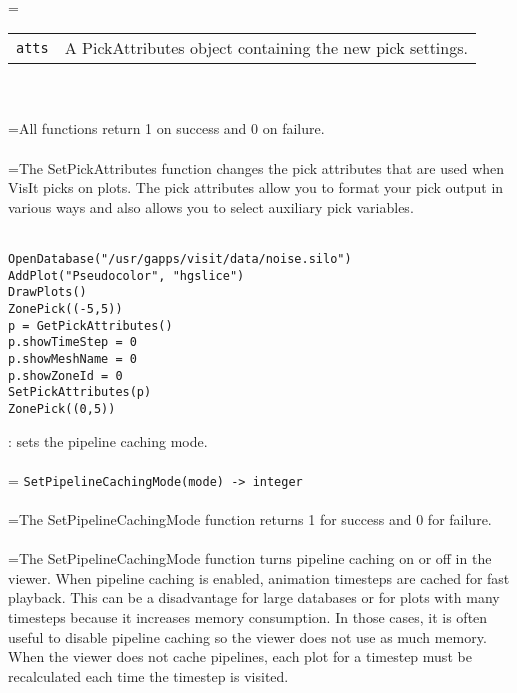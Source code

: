 \documentclass[10pt,a4paper]{report}
\begin{document}
 \\ 
\hangindent=\parindent 
\begin{tabular}{lp{9cm}}
\verb!atts! & A PickAttributes object containing the new pick settings. \\
\end{tabular} \\[-2mm]


 \\ 
\hangindent=\parindent All functions return 1 on success and 0 on failure. \\[-3mm] 

 \\ 
\hangindent=\parindent The SetPickAttributes function changes the pick attributes that are used when VisIt picks on plots. The pick attributes allow you to format your pick output in various ways and also allows you to select auxiliary pick variables. \\[-3mm] 

\\[-6mm]
\begin{verbatim}OpenDatabase("/usr/gapps/visit/data/noise.silo")
AddPlot("Pseudocolor", "hgslice")
DrawPlots()
ZonePick((-5,5))
p = GetPickAttributes()
p.showTimeStep = 0
p.showMeshName = 0
p.showZoneId = 0
SetPickAttributes(p)
ZonePick((0,5))
\end{verbatim}
\newpage


{}
: sets the pipeline caching mode.\\[-3mm]

 \\ 
\hangindent=\parindent 
\verb!SetPipelineCachingMode(mode) -> integer!\\ [-3mm]

 \\ 
\hangindent=\parindent The SetPipelineCachingMode function returns 1 for success and 0 for failure. \\[-3mm] 

 \\ 
\hangindent=\parindent The SetPipelineCachingMode function turns pipeline caching on or off in the viewer. When pipeline caching is enabled, animation timesteps are cached for fast playback. This can be a disadvantage for large databases or for plots with many timesteps because it increases memory consumption. In those cases, it is often useful to disable pipeline caching so the viewer does not use as much memory. When the viewer does not cache pipelines, each plot for a timestep must be recalculated each time the timestep is visited. \\[-3mm] 
\end{document}
